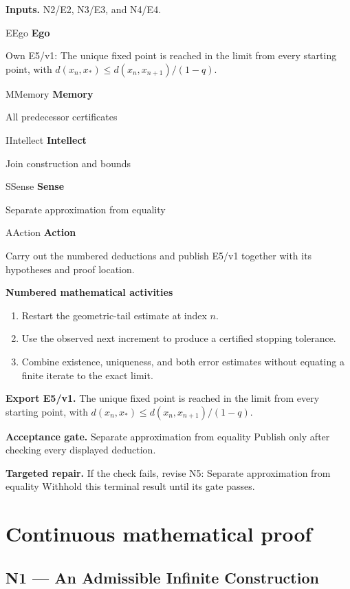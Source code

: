 \documentclass[preprint,12pt,aps,pra,showkeys,amsmath,amssymb,superscriptaddress,floatfix]{revtex4-2}
\theoremstyle{definition}
\theoremstyle{remark}
\newcommand{\mmfaculty}[3]{%
 \begin{mmfacultybox}{#1}{#2}
 {\sffamily\bfseries\color{MMBlue}#2}\par\smallskip #3
 \end{mmfacultybox}}
\newcommand{\field}[2]{\par\smallskip\noindent\textbf{#1.} #2\par}
\begin{document}
\field{Inputs}{N2/E2, N3/E3, and N4/E4.}

\mmfaculty{E}{Ego}{Own E5/v1: The unique fixed point is reached in the limit from every
starting point, with \(d(x_n,x_*)\le d(x_n,x_{n+1})/(1-q)\).}

\mmfaculty{M}{Memory}{All predecessor certificates}

\mmfaculty{I}{Intellect}{Join construction and bounds}

\mmfaculty{S}{Sense}{Separate approximation from equality}

\mmfaculty{A}{Action}{Carry out the numbered deductions and publish E5/v1 together with its
hypotheses and proof location.}

\smallskip\noindent\textbf{Numbered mathematical activities}

\begin{enumerate}[label=N5.\arabic*,leftmargin=3.4em]

\item Restart the geometric-tail estimate at index \(n\).

\item Use the observed next increment to produce a certified stopping
tolerance.

\item Combine existence, uniqueness, and both error estimates without equating
a finite iterate to the exact limit.

\end{enumerate}

\field{Export E5/v1}{The unique fixed point is reached in the limit from every starting
point, with \(d(x_n,x_*)\le d(x_n,x_{n+1})/(1-q)\).}

\field{Acceptance gate}{Separate approximation from equality Publish only after checking every
displayed deduction.}

\field{Targeted repair}{If the check fails, revise N5: Separate approximation from equality
Withhold this terminal result until its gate passes.}

\endgroup\clearpage\section{Continuous mathematical proof}\label{sec:proof}

\subsection{N1 --- An Admissible Infinite
Construction}\label{n1-an-admissible-infinite-construction}
\end{document}
